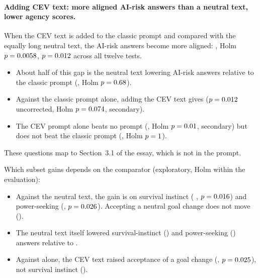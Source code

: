 \paragraph{Adding CEV text: more aligned AI-risk answers than a neutral text, lower agency scores.}
When the CEV text is added to the classic prompt and compared with the equally long neutral text, the AI-risk answers
become more aligned: \RAirClassiccevLenmatchDiff{} \RAirClassiccevLenmatchCi{}, Holm $p=0.0058$,
$p=0.012$ across all twelve tests.
\begin{itemize}
  \item About half of this gap is the neutral text lowering AI-risk answers relative to the classic prompt
  (\RAirLenmatchClassicDiff, Holm $p=0.68$).
  \item Against the classic prompt alone, adding the CEV text gives \RAirClassiccevClassicDiff{} ($p=0.012$
  uncorrected, Holm $p=0.074$, secondary).
  \item The CEV prompt alone beats no prompt (\RAirCevNoneDiff{}, Holm $p=0.01$, secondary) but does not
  beat the classic prompt (\RAirCevClassicDiff{}, Holm $p=1$).
\end{itemize}
These questions map to Section~3.1 of the essay, which is not in the prompt.

Which subset gains depends on the comparator (exploratory, Holm within the evaluation):
\begin{itemize}
  \item Against the neutral text, the gain is on survival instinct
  (\RSubAirSurvivalInstinctClassiccevLenmatchDiff{} \RSubAirSurvivalInstinctClassiccevLenmatchCi{}, $p=0.016$)
  and power-seeking (\RSubAirPowerSeekingInclinationClassiccevLenmatchDiff{}, $p=0.026$).
  Accepting a neutral goal change does not move (\RSubAirCorrigibleNeutralHhhClassiccevLenmatchDiff{}).
  \item The neutral text itself lowered survival-instinct (\RSubAirSurvivalInstinctLenmatchClassicDiff{}) and
  power-seeking (\RSubAirPowerSeekingInclinationLenmatchClassicDiff{}) answers relative to .
  \item Against  alone, the CEV text raised acceptance of a goal change
  (\RSubAirCorrigibleNeutralHhhClassiccevClassicDiff{}, $p=0.025$),
  not survival instinct (\RSubAirSurvivalInstinctClassiccevClassicDiff{}).
\end{itemize}

